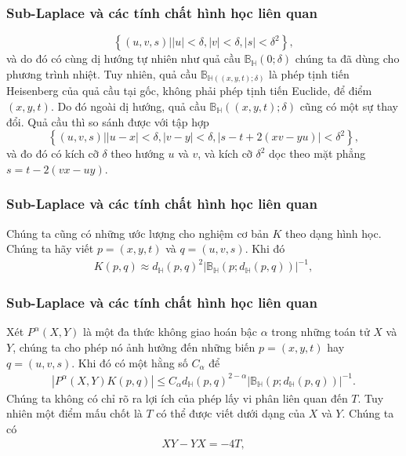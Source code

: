 \documentclass[11pt]{beamer}
\numberwithin{equation}{section}
\theoremstyle{plain}
\theoremstyle{definition}
\theoremstyle{remark}
\begin{document}
\begin{frame}\frametitle{Sub-Laplace và các tính chất hình học liên quan}
\[\left\{ {\left( {u,v,s} \right)|\left| u \right| < \delta ,\left| v \right| < \delta ,\left| s \right| < {\delta ^2}} \right\},\]
và do đó có cùng dị hướng tự nhiên như quả cầu $\mathbb{B}_{\mathbb{H}}\left(0;\delta\right)$ chúng ta đã dùng cho phương trình nhiệt. Tuy nhiên, quả cầu $\mathbb{B}_{\mathbb{H}\left(\left(x,y,t\right);\delta\right)}$ là phép tịnh tiến Heisenberg của quả cầu tại gốc, không phải phép tịnh tiến Euclide, để điểm $\left(x,y,t\right)$. Do đó ngoài dị hướng, quả cầu $\mathbb{B}_{\mathbb{H}}\left(\left(x,y,t\right);\delta\right)$ cũng có một sự thay đổi. Quả cầu thì so sánh được với tập hợp
\[\left\{ {\left( {u,v,s} \right)|\left| {u - x} \right| < \delta ,\left| {v - y} \right| < \delta ,\left| {s - t + 2\left( {xv - yu} \right)} \right| < {\delta ^2}} \right\},\]
và đo đó có kích cỡ $\delta$ theo hướng $u$ và $v$, và kích cỡ $\delta^{2}$ dọc theo mặt phẳng $s=t-2\left(vx-uy\right)$.
\end{frame}
\begin{frame}\frametitle{Sub-Laplace và các tính chất hình học liên quan}
Chúng ta cũng có những ước lượng cho nghiệm cơ bản $K$ theo dạng hình học. Chúng ta hãy viết $p=\left(x,y,t\right)$ và $q=\left(u,v,s\right)$. Khi đó
\begin{align}\label{65}
K\left(p,q\right)\approx d_{\mathbb{H}}\left(p,q\right)^{2}\left|\mathbb{B}_{\mathbb{H}}\left(p;d_{\mathbb{H}}\left(p,q\right)\right)\right|^{-1},
\end{align}
\end{frame}


\begin{frame}\frametitle{Sub-Laplace và các tính chất hình học liên quan}
Xét $P^{\alpha}\left(X,Y\right)$ là một đa thức không giao hoán bậc $\alpha$ trong những toán tử $X$ và $Y$, chúng ta cho phép nó ảnh hưởng đến những biến $p=\left(x,y,t\right)$ hay $q=\left(u,v,s\right)$. Khi đó có một hằng số $C_\alpha$ để
\begin{align}\label{66}
\left| {{P^\alpha }\left( {X,Y} \right)K\left( {p,q} \right)} \right| \le {C_\alpha }{d_\mathbb{H}}{\left( {p,q} \right)^{2 - \alpha }}{\left| {{\mathbb{B}_\mathbb{H}}\left( {p;{d_\mathbb{H}}\left( {p,q} \right)} \right)} \right|^{ - 1}}.
\end{align}
Chúng ta không có chỉ rõ ra lợi ích của phép lấy vi phân liên quan đến $T$. Tuy nhiên một điểm mấu chốt là $T$ có thể được viết dưới dạng của $X$ và $Y$. Chúng ta có
\begin{align}\label{67}
XY-YX=-4T,
\end{align}
\end{frame}
\end{document}

